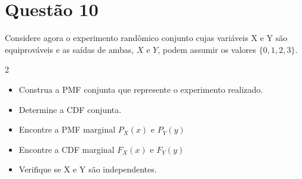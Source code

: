 \section{Questão 10}

Considere agora o experimento randômico conjunto cujas variáveis X e Y são equiprováveis e as saídas de ambas, $X$ e $Y$, podem assumir os valores $\{0,1,2,3\}$.

\begin{multicols}{2}
\begin{itemize}
    \item [a)] Construa a PMF conjunta que represente o experimento realizado.
    \item [b)] Determine a CDF conjunta.
    \item [c)] Encontre a PMF marginal $P_X(x)$ e $P_Y(y)$
    \item [d)] Encontre a CDF marginal $F_X(x)$ e $F_Y(y)$
    \item [e)] Verifique se X e Y são independentes.
\end{itemize}
\end{multicols}

